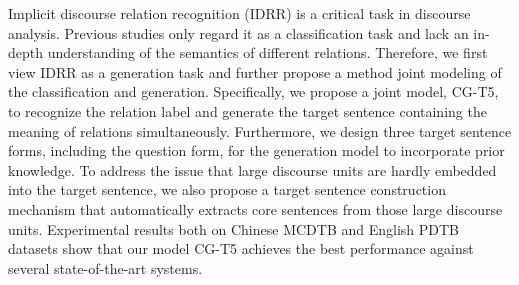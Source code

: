 Implicit discourse relation recognition (IDRR) is a critical task in discourse analysis. Previous studies only regard it as a classification task and lack an in-depth understanding of the semantics of different relations. Therefore, we first view IDRR as a generation task and further propose a method joint modeling of the classification and generation. Specifically, we propose a joint model, CG-T5, to recognize the relation label and generate the target sentence containing the meaning of relations simultaneously. Furthermore, we design three target sentence forms, including the question form, for the generation model to incorporate prior knowledge. To address the issue that large discourse units are hardly embedded into the target sentence, we also propose a target sentence construction mechanism that automatically extracts core sentences from those large discourse units. Experimental results both on Chinese MCDTB and English PDTB datasets show that our model CG-T5 achieves the best performance against several state-of-the-art systems.
